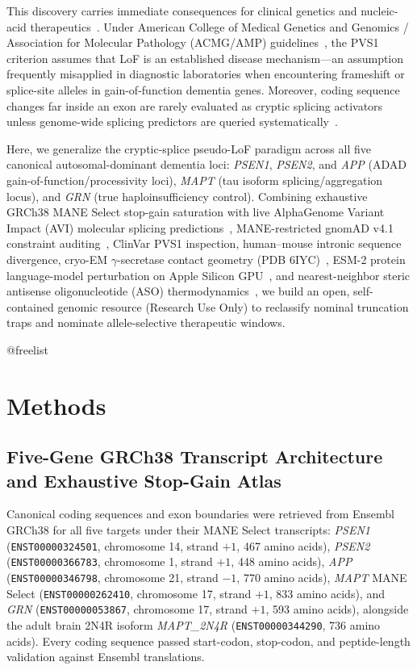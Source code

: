\documentclass[11pt,a4paper]{article}
\makeatletter
\newcommand{\FloatBarrier}{%
  \par
  \expandafter\ifx\csname @freelist\endcsname\relax\else
    \ifx\@deferlist\@empty\else
      \clearpage
    \fi
  \fi
}
\let\orig@section\section
\renewcommand{\section}{\FloatBarrier\orig@section}
\makeatother
\begin{document}
This discovery carries immediate consequences for clinical genetics and nucleic-acid therapeutics~\cite{menendez2004,farinas2026}. Under American College of Medical Genetics and Genomics / Association for Molecular Pathology (ACMG/AMP) guidelines~\cite{richards2015,aboutayoun2018}, the PVS1 criterion assumes that LoF is an established disease mechanism—an assumption frequently misapplied in diagnostic laboratories when encountering frameshift or splice-site alleles in gain-of-function dementia genes. Moreover, coding sequence changes far inside an exon are rarely evaluated as cryptic splicing activators unless genome-wide splicing predictors are queried systematically~\cite{baralle2005,avsec2026}.

Here, we generalize the cryptic-splice pseudo-LoF paradigm across all five canonical autosomal-dominant dementia loci: \textit{PSEN1}, \textit{PSEN2}, and \textit{APP} (ADAD gain-of-function/processivity loci), \textit{MAPT} (tau isoform splicing/aggregation locus), and \textit{GRN} (true haploinsufficiency control). Combining exhaustive GRCh38 MANE Select stop-gain saturation with live AlphaGenome Variant Impact (AVI) molecular splicing predictions~\cite{avsec2026,alphagenome_atlas2026}, MANE-restricted gnomAD v4.1 constraint auditing~\cite{karczewski2020}, ClinVar PVS1 inspection, human--mouse intronic sequence divergence, cryo-EM $\gamma$-secretase contact geometry (PDB 6IYC)~\cite{zhou2019}, ESM-2 protein language-model perturbation on Apple Silicon GPU~\cite{lin2023}, and nearest-neighbor steric antisense oligonucleotide (ASO) thermodynamics~\cite{santalucia1998}, we build an open, self-contained genomic resource (Research Use Only) to reclassify nominal truncation traps and nominate allele-selective therapeutic windows.

\section{Methods}

\subsection{Five-Gene GRCh38 Transcript Architecture and Exhaustive Stop-Gain Atlas}
Canonical coding sequences and exon boundaries were retrieved from Ensembl GRCh38 for all five targets under their MANE Select transcripts: \textit{PSEN1} (\texttt{ENST00000324501}, chromosome 14, strand $+1$, 467 amino acids), \textit{PSEN2} (\texttt{ENST00000366783}, chromosome 1, strand $+1$, 448 amino acids), \textit{APP} (\texttt{ENST00000346798}, chromosome 21, strand $-1$, 770 amino acids), \textit{MAPT} MANE Select (\texttt{ENST00000262410}, chromosome 17, strand $+1$, 833 amino acids), and \textit{GRN} (\texttt{ENST00000053867}, chromosome 17, strand $+1$, 593 amino acids), alongside the adult brain 2N4R isoform \textit{MAPT\_2N4R} (\texttt{ENST00000344290}, 736 amino acids). Every coding sequence passed start-codon, stop-codon, and peptide-length validation against Ensembl translations.
\end{document}

